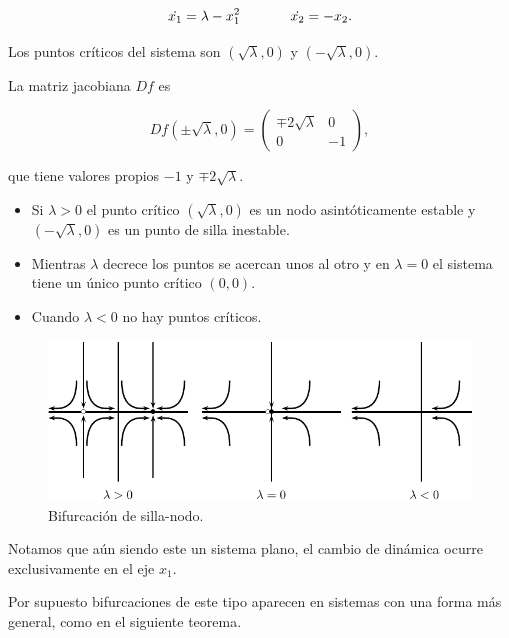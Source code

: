 \begin{example}
$$ 
	\dot{x_1} = \lambda - x_1^2 \hspace{0.5in} \dot{x_2} = -x_2.
$$

Los puntos críticos del sistema son $(\sqrt{\lambda}, 0)$ y $(-\sqrt{\lambda}, 0).$

La matriz jacobiana $Df$ es

$$
Df(\pm \sqrt{\lambda}, 0) = \left( \begin{array}{ll}
	\mp 2 \sqrt{\lambda} & 0 \\
	0 & -1
\end{array} \right),
$$

que tiene valores propios $-1$ y $\mp 2\sqrt{\lambda}$.

\begin{itemize}
	\item Si $\lambda > 0$ el punto crítico $(\sqrt{\lambda}, 0)$ es un nodo asintóticamente estable y $(-\sqrt{\lambda}, 0)$ es un punto de silla inestable.
	\item Mientras $\lambda$ decrece los puntos se acercan unos al otro y en $\lambda = 0$ el sistema tiene un único punto crítico $(0,0)$.
	\item Cuando $\lambda < 0$ no hay puntos críticos.
\end{itemize}

\begin{figure}[ht] \centering
    \includegraphics[scale=1.0]{figures/bifurcations-saddlenode.pdf}
    \caption{Bifurcación de silla-nodo.}
\end{figure}

Notamos que aún siendo este un sistema plano, el cambio de dinámica ocurre exclusivamente en el eje $x_1$.
\end{example}

Por supuesto bifurcaciones de este tipo aparecen en sistemas con una forma más general, como en el siguiente teorema.

